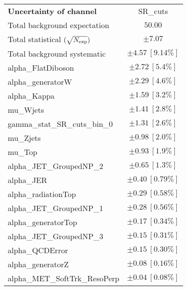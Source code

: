
\begin{table}
\begin{center}
\setlength{\tabcolsep}{0.0pc}
\begin{tabular*}{\textwidth}{@{\extracolsep{\fill}}lc}
\noalign{\smallskip}\hline\noalign{\smallskip}
{\bf Uncertainty of channel}                                    & SR\_cuts            \\
\noalign{\smallskip}\hline\noalign{\smallskip}
Total background expectation             &  $50.00$       \\
\noalign{\smallskip}\hline\noalign{\smallskip}
Total statistical $(\sqrt{N_{\rm exp}})$              & $\pm 7.07$       \\
Total background systematic               & $\pm 4.57\ [9.14\%] $             \\
\noalign{\smallskip}\hline\noalign{\smallskip}
\noalign{\smallskip}\hline\noalign{\smallskip}
alpha\_FlatDiboson         & $\pm 2.72\ [5.4\%] $       \\
alpha\_generatorW         & $\pm 2.29\ [4.6\%] $       \\
alpha\_Kappa         & $\pm 1.59\ [3.2\%] $       \\
mu\_Wjets         & $\pm 1.41\ [2.8\%] $       \\
gamma\_stat\_SR\_cuts\_bin\_0         & $\pm 1.31\ [2.6\%] $       \\
mu\_Zjets         & $\pm 0.98\ [2.0\%] $       \\
mu\_Top         & $\pm 0.93\ [1.9\%] $       \\
alpha\_JET\_GroupedNP\_2         & $\pm 0.65\ [1.3\%] $       \\
alpha\_JER         & $\pm 0.40\ [0.79\%] $       \\
alpha\_radiationTop         & $\pm 0.29\ [0.58\%] $       \\
alpha\_JET\_GroupedNP\_1         & $\pm 0.28\ [0.56\%] $       \\
alpha\_generatorTop         & $\pm 0.17\ [0.34\%] $       \\
alpha\_JET\_GroupedNP\_3         & $\pm 0.15\ [0.31\%] $       \\
alpha\_QCDError         & $\pm 0.15\ [0.30\%] $       \\
alpha\_generatorZ         & $\pm 0.08\ [0.16\%] $       \\
alpha\_MET\_SoftTrk\_ResoPerp         & $\pm 0.04\ [0.08\%] $       \\

\end{tabular*}
\end{center}
\end{table}
